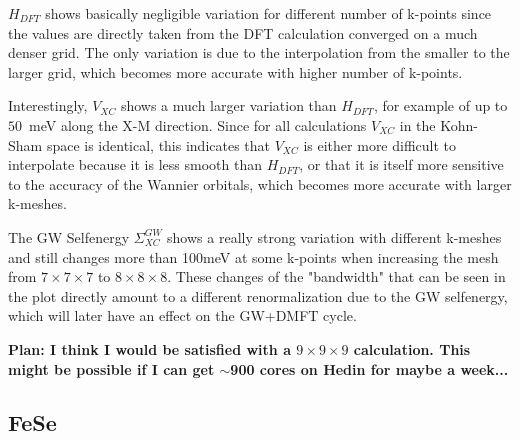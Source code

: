 \documentclass[12pt,a4paper]{scrartcl}
\numberwithin{equation}{section}
\begin{document}
$H_{DFT}$ shows basically negligible variation for different number of k-points 
since the values are directly taken from the DFT calculation converged on a much denser grid.
The only variation is due to the interpolation from the smaller to the larger grid,
which becomes more accurate  with higher number of k-points.

Interestingly, $V_{XC}$ shows a much larger variation than $H_{DFT}$, for example of up 
to $50$~meV along the X-M direction. Since for all calculations $V_{XC}$ in the Kohn-Sham
space is identical, this indicates that $V_{XC}$ is either more difficult to interpolate
because it is less smooth than $H_{DFT}$, or that it is itself
more sensitive to the accuracy of the Wannier orbitals, which becomes more accurate
with larger k-meshes.
 
The GW Selfenergy $\Sigma^{GW}_{XC}$ shows a really strong variation with different k-meshes
and still changes more than 100meV at some k-points when increasing the mesh
from $7\times 7 \times 7$ to $8\times 8 \times 8$.
These changes of the "bandwidth" that can be seen in the plot directly amount to a different 
renormalization due to the GW selfenergy, which will later have an effect
on the GW+DMFT cycle.

\bigskip

\textbf{Plan: I think I would be satisfied with a $9\times 9  \times 9$
calculation. This might be possible if I can get $\sim$900 cores on Hedin for maybe a week...}



\clearpage

\subsection{FeSe}
\end{document}
